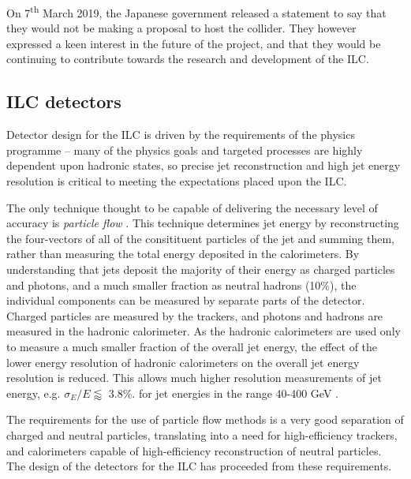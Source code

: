 On 7\textsuperscript{th} March 2019, the Japanese government released a statement to say that they would not be making a proposal to host the collider\cite{japan-ilc-decision}. They however expressed a keen interest in the future of the project, and that they would be continuing to contribute towards the research and development of the \acrshort{ILC}.

\subsection{ILC detectors}
\label{section:ILC-detectors}
Detector design for the \acrshort{ILC} is driven by the requirements of the physics programme -- many of the physics goals and targeted processes are highly dependent upon hadronic states, so precise jet reconstruction and high jet energy resolution is critical to meeting the expectations placed upon the \acrshort{ILC}. 

The only technique thought to be capable of delivering the necessary level of accuracy is \textit{particle flow} \cite{particle-flow-algorithms}. This technique determines jet energy by reconstructing the four-vectors of all of the consitituent particles of the jet and summing them, rather than measuring the total energy deposited in the calorimeters. By understanding that jets deposit the majority of their energy as charged particles and photons, and a much smaller fraction as neutral hadrons (10\%), the individual components can be measured by separate parts of the detector. Charged particles are measured by the trackers, and photons and hadrons are measured in the hadronic calorimeter. As the hadronic calorimeters are used only to measure a much smaller fraction of the overall jet energy, the effect of the lower energy resolution of hadronic calorimeters on the overall jet energy resolution is reduced. This allows much higher resolution measurements of jet energy, e.g. $\sigma_E / E \lessapprox$ 3.8\%. for jet energies in the range 40-400 GeV \cite{particle-flow-algorithms} .

The requirements for the use of particle flow methods is a very good separation of charged and neutral particles, translating into a need for high-efficiency trackers, and calorimeters capable of high-efficiency reconstruction of neutral particles. The design of the detectors for the \acrshort{ILC} has proceeded from these requirements.

